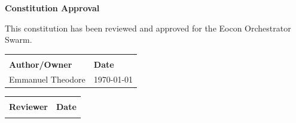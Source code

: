 \documentclass[12pt,letterpaper]{article}
\begin{document}
\vspace{1cm}

\begin{tcolorbox}[colback=gray!5,colframe=neutralgray]
\textbf{Constitution Approval}

\vspace{0.5cm}

This constitution has been reviewed and approved for the Eocon Orchestrator Swarm.

\vspace{1cm}

\begin{tabular}{p{6cm}p{6cm}}
\hrulefill & \hrulefill \\
\textbf{Author/Owner} & \textbf{Date} \\
Emmanuel Theodore & \today \\
\end{tabular}

\vspace{1cm}

\begin{tabular}{p{6cm}p{6cm}}
\hrulefill & \hrulefill \\
\textbf{Reviewer} & \textbf{Date} \\
& \\
\end{tabular}
\end{tcolorbox}
\end{document}
